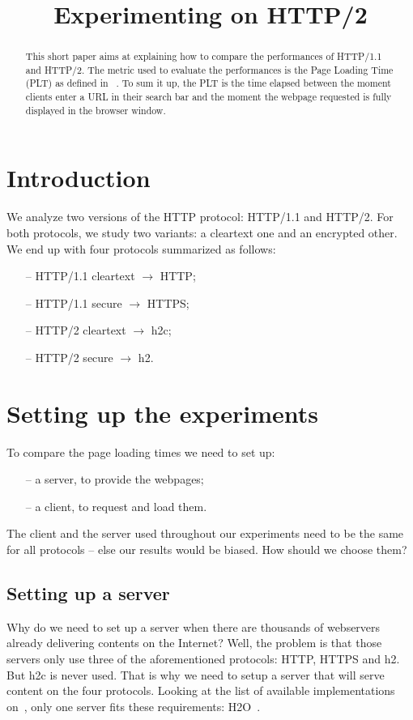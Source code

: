 \documentclass[12pt, notitlepage]{article}
\begin{document}


\title{Experimenting on HTTP/2}
\maketitle

\begin{abstract}
This short paper aims at explaining how to compare the performances
of HTTP/1.1 and HTTP/2.
The metric used to evaluate the performances is the Page Loading Time
(PLT) as defined in ~\cite{w3c}.
To sum it up, the PLT is the time elapsed between the moment clients
enter a URL in their search bar and the moment the webpage requested is
fully displayed in the browser window.
\end{abstract}

\section{Introduction}
We analyze two versions of the HTTP protocol: HTTP/1.1 and HTTP/2.
For both protocols, we study two variants: a cleartext one and an
encrypted other. We end up with four protocols summarized as follows:
\begin{itemize}[noitemsep]
	\item[--] HTTP/1.1 cleartext $\to$ HTTP;
	\item[--] HTTP/1.1 secure $\to$ HTTPS;
	\item[--] HTTP/2 cleartext $\to$ h2c;
	\item[--] HTTP/2 secure $\to$ h2.
\end{itemize}
\newpage

\section{Setting up the experiments}
To compare the page loading times we need to set up: 
\begin{itemize}[noitemsep]
\item[--] a server, to provide the webpages;
\item[--] a client, to request and load them.
\end{itemize}

The client and the server used throughout our experiments need to be the
same for all protocols -- else our results would be biased. How should we
choose them?

\subsection{Setting up a server}
Why do we need to set up a server when there are thousands of webservers
already delivering contents on the Internet? Well, the problem is that
those servers only use three of the aforementioned protocols: HTTP, HTTPS
and h2. But h2c is never used.
That is why we need to setup a server that will serve content on the 
four protocols. 
Looking at the list of available 
implementations on~\cite{implem}, only one server fits these requirements:
H2O~\cite{h2o}.\\
\end{document}
